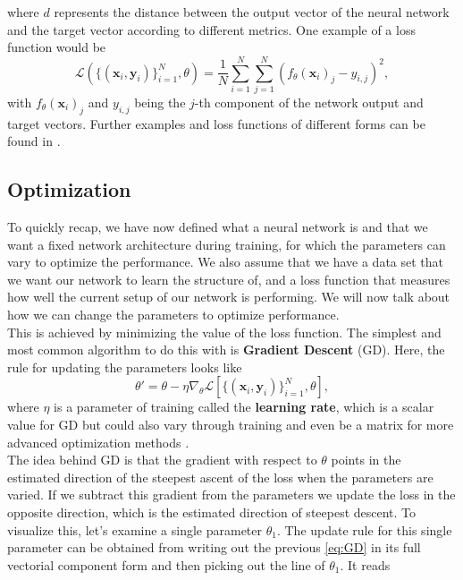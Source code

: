 where $d$ represents the distance between the output vector of the neural network and the target vector according to different metrics. One example of a loss function would be 
\begin{equation}
	\mathscr{L}\left( \{(\mathbf{x}_i, \mathbf{y}_i)\}_{i=1}^{N}, \theta \right) = \frac{1}{N} \sum_{i=1}^{N} \sum_{j=1}^{N} \left(f_\theta(\mathbf{x}_i)_j - y_{i,j}\right)^2,
\end{equation}
with $f_\theta(\mathbf{x}_i)_j$ and $y_{i,j}$ being the $j$-th component of the network output and target vectors. Further examples and loss functions of different forms can be found in \cite{LossExamplePaper}.

\subsection{Optimization}\label{sec:NetworkOptimization}
To quickly recap, we have now defined what a neural network is and that we want a fixed network architecture during training, for which the parameters can vary to optimize the performance. We also assume that we have a data set that we want our network to learn the structure of, and a loss function that measures how well the current setup of our network is performing. We will now talk about how we can change the parameters to optimize performance.\\
This is achieved by minimizing the value of the loss function. The simplest and most common algorithm to do this with is \textbf{Gradient Descent} (GD). Here, the rule for updating the parameters looks like \cite{GradientDescentOverview}
\begin{equation}\label{eq:GD}
	\theta' = \theta - \eta \nabla_\theta \mathscr{L}\left[ \{(\mathbf{x}_i, \mathbf{y}_i)\}_{i=1}^{N}, \theta \right],
\end{equation}
where $\eta$ is a parameter of training called the \textbf{learning rate}, which is a scalar value for GD but could also vary through training and even be a matrix for more advanced optimization methods \cite{ThePrinciplesOfDeepLearningTheory}.\\
The idea behind GD is that the gradient with respect to $\theta$ points in the estimated direction of the steepest ascent of the loss when the parameters are varied. If we subtract this gradient from the parameters we update the loss in the opposite direction, which is the estimated direction of steepest descent. To visualize this, let's examine a single parameter $\theta_1$. The update rule for this single parameter can be obtained from writing out the previous \cref{eq:GD} in its full vectorial component form and then picking out the line of $\theta_1$. It reads
